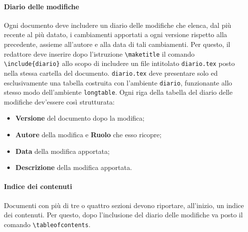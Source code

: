 \paragraph{Diario delle modifiche} Ogni documento deve includere un diario delle modifiche che elenca, dal più recente al più datato, i cambiamenti apportati a ogni versione rispetto alla precedente, assieme all'autore e alla data di tali cambiamenti. Per questo, il redattore deve inserire dopo l'istruzione \texttt{\textbackslash maketitle} il comando \texttt{\textbackslash include\{diario\}} allo scopo di includere un file intitolato \texttt{diario.tex} posto nella stessa cartella del documento. \texttt{diario.tex} deve presentare solo ed esclusivamente una tabella costruita con l'ambiente \texttt{diario}, funzionante allo stesso modo dell'ambiente \texttt{longtable}. Ogni riga della tabella del diario delle modifiche dev'essere così strutturata:
\begin{itemize}
 \item \textbf{Versione} del documento dopo la modifica;
 \item \textbf{Autore} della modifica e \textbf{Ruolo} che esso ricopre;
 \item \textbf{Data} della modifica apportata;
 \item \textbf{Descrizione} della modifica apportata.
\end{itemize}
\paragraph{Indice dei contenuti} Documenti con più di tre o quattro sezioni devono riportare, all'inizio, un indice dei contenuti. Per questo, dopo l'inclusione del diario delle modifiche va posto il comando \texttt{\textbackslash tableofcontents}.
